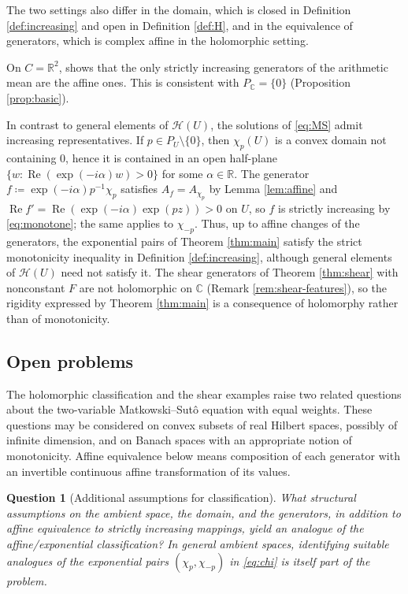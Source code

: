 \documentclass[a4paper, reqno, 11pt]{amsart}
\newtheorem{Que}[Thm]{Question}
\theoremstyle{definition}
\begin{document}
The two settings also differ in the domain, which is closed in Definition \ref{def:increasing} and open in Definition \ref{def:H}, and in the equivalence of generators, which is complex affine in the holomorphic setting.

On $C = \mathbb{R}^2$, \cite[Theorem 4]{Toth} shows that the only strictly increasing generators of the arithmetic mean are the affine ones. 
This is consistent with $P_{\mathbb{C}} = \{0\}$ (Proposition \ref{prop:basic}).

In contrast to general elements of $\mathcal{H}(U)$, the solutions of \eqref{eq:MS} admit increasing representatives.
If $p \in P_U \setminus \{0\}$, then $\chi_p(U)$ is a convex domain not containing $0$, hence it is contained in an open half-plane $\{ w : \operatorname{Re}\left(\exp(-i\alpha) w\right) > 0 \}$ for some $\alpha \in \mathbb{R}$.
The generator $f \coloneqq  \exp(-i\alpha) p^{-1} \chi_p$ satisfies $A_f = A_{\chi_p}$ by Lemma \ref{lem:affine} and $\operatorname{Re} f' = \operatorname{Re}\left( \exp(-i\alpha) \exp(pz) \right) > 0$ on $U$, so $f$ is strictly increasing by \eqref{eq:monotone}; the same applies to $\chi_{-p}$.
Thus, up to affine changes of the generators, the exponential pairs of Theorem \ref{thm:main} satisfy the strict monotonicity inequality in Definition \ref{def:increasing}, although general elements of $\mathcal{H}(U)$ need not satisfy it.
The shear generators of Theorem \ref{thm:shear} with nonconstant $F$ are not holomorphic on $\mathbb{C}$ (Remark \ref{rem:shear-features}), 
so the rigidity expressed by Theorem \ref{thm:main} is a consequence of holomorphy rather than of monotonicity.

\subsection{Open problems}\label{subsec:open}

The holomorphic classification and the shear examples raise two related questions about the two-variable Matkowski--Sut\^o equation with equal weights.
These questions may be considered on convex subsets of real Hilbert spaces, possibly of infinite dimension, and on Banach spaces with an appropriate notion of monotonicity.
Affine equivalence below means composition of each generator with an invertible continuous affine transformation of its values.

\begin{Que}[Additional assumptions for classification]\label{que:classification}
What structural assumptions on the ambient space, the domain, and the generators, in addition to affine equivalence to strictly increasing mappings, yield an analogue of the affine/exponential classification?
In general ambient spaces, identifying suitable analogues of the exponential pairs $(\chi_p,\chi_{-p})$ in \eqref{eq:chi} is itself part of the problem.
\end{Que}
\end{document}
